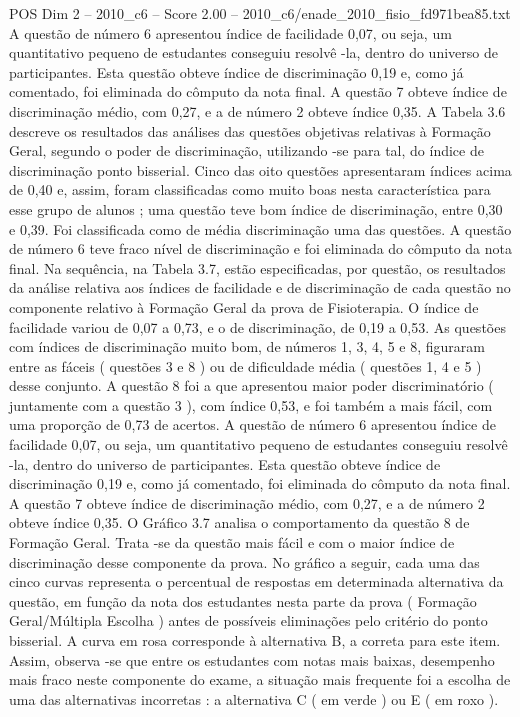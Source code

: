 \begin{textsample}{POS Dim 2 – 2010\_c6 – Score 2.00 – 2010\_c6/enade\_2010\_fisio\_fd971bea85.txt}
A questão de número 6 apresentou índice de facilidade 0,07, ou seja, um quantitativo pequeno de estudantes conseguiu resolvê -la, dentro do universo de participantes.
Esta questão obteve índice de discriminação 0,19 e, como já comentado, foi eliminada do cômputo da nota final.
A questão 7 obteve índice de discriminação médio, com 0,27, e a de número 2 obteve índice 0,35.
A Tabela 3.6 descreve os resultados das análises das questões objetivas relativas à Formação Geral, segundo o poder de discriminação, utilizando -se para tal, do índice de discriminação ponto bisserial.
Cinco das oito questões apresentaram índices acima de 0,40 e, assim, foram classificadas como muito boas nesta característica para esse grupo de alunos ; uma questão teve bom índice de discriminação, entre 0,30 e 0,39.
Foi classificada como de média discriminação uma das questões.
A questão de número 6 teve fraco nível de discriminação e foi eliminada do cômputo da nota final.
Na sequência, na Tabela 3.7, estão especificadas, por questão, os resultados da análise relativa aos índices de facilidade e de discriminação de cada questão no componente relativo à Formação Geral da prova de Fisioterapia.
O índice de facilidade variou de 0,07 a 0,73, e o de discriminação, de 0,19 a 0,53.
As questões com índices de discriminação muito bom, de números 1, 3, 4, 5 e 8, figuraram entre as fáceis ( questões 3 e 8 ) ou de dificuldade média ( questões 1, 4 e 5 ) desse conjunto.
A questão 8 foi a que apresentou maior poder discriminatório ( juntamente com a questão 3 ), com índice 0,53, e foi também a mais fácil, com uma proporção de 0,73 de acertos.
A questão de número 6 apresentou índice de facilidade 0,07, ou seja, um quantitativo pequeno de estudantes conseguiu resolvê -la, dentro do universo de participantes.
Esta questão obteve índice de discriminação 0,19 e, como já comentado, foi eliminada do cômputo da nota final.
A questão 7 obteve índice de discriminação médio, com 0,27, e a de número 2 obteve índice 0,35.
O Gráfico 3.7 analisa o comportamento da questão 8 de Formação Geral.
Trata -se da questão mais fácil e com o maior índice de discriminação desse componente da prova.
No gráfico a seguir, cada uma das cinco curvas representa o percentual de respostas em determinada alternativa da questão, em função da nota dos estudantes nesta parte da prova ( Formação Geral/Múltipla Escolha ) antes de possíveis eliminações pelo critério do ponto bisserial.
A curva em rosa corresponde à alternativa B, a correta para este item.
Assim, observa -se que entre os estudantes com notas mais baixas, desempenho mais fraco neste componente do exame, a situação mais frequente foi a escolha de uma das alternativas incorretas : a alternativa C ( em verde ) ou E ( em roxo ).

\end{textsample}
